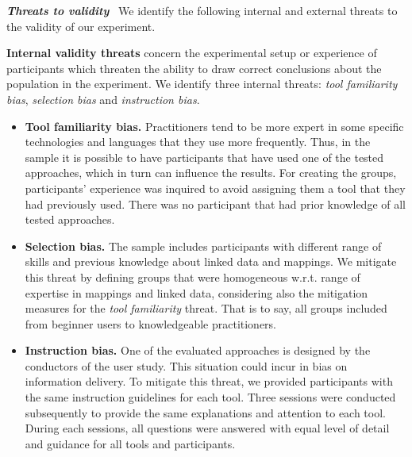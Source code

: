 \noindent\textit{\textbf{Threats to validity}}~\parencite{creswell2017research} We identify the following internal and external threats to the validity of our experiment.

\textbf{Internal validity threats} concern the experimental setup or experience of participants which threaten the ability to draw correct conclusions about the population in the experiment. We identify three internal threats: \textit{tool familiarity bias}, \textit{selection bias} and \textit{instruction bias}.
\begin{itemize}
    \item \textbf{Tool familiarity bias.} Practitioners tend to be more expert in some specific technologies and languages that they use more frequently. Thus, in the sample it is possible to have participants that have used one of the tested approaches, which in turn can influence the results. For creating the groups, participants' experience was inquired to avoid assigning them a tool that they had previously used. There was no participant that had prior knowledge of all tested approaches.
    \item \textbf{Selection bias.} The sample includes participants with different range of skills and previous knowledge about linked data and mappings. We mitigate this threat by defining groups that were  homogeneous w.r.t. range of expertise in mappings and linked data, considering also the mitigation measures for the \textit{tool familiarity} threat. That is to say, all groups included from beginner users to knowledgeable practitioners. 
    \item \textbf{Instruction bias.} One of the evaluated approaches is designed by the conductors of the user study. This situation could incur in bias on information delivery. To mitigate this threat, we provided participants with the same instruction guidelines for each tool. Three sessions were conducted subsequently to provide the same explanations and attention to each tool. During each sessions, all questions were answered with equal level of detail and guidance for all tools and participants.
\end{itemize}

